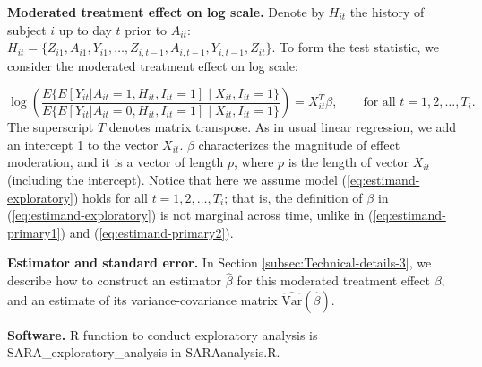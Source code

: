 \documentclass[11pt]{article}
\begin{document}
\textbf{Moderated treatment effect on log scale.} Denote by $H_{it}$ the history
of subject $i$ up to day $t$ prior to $A_{it}$: $H_{it}=\{Z_{i1},A_{i1},Y_{i1},\ldots,Z_{i,t-1},A_{i,t-1},Y_{i,t-1},Z_{it}\}$.
To form the test statistic, we consider the moderated treatment effect
on log scale:

\begin{equation}
\log\left(\frac{E\{E[Y_{it}|A_{it}=1,H_{it}, I_{it} = 1]\mid X_{it}, I_{it} = 1\}}{E\{E[Y_{it}|A_{it}=0,H_{it}, I_{it} = 1]\mid X_{it}, I_{it} = 1\}}\right)=X_{it}^{T}\beta,\qquad\text{for all }t=1,2,\ldots,T_i.\label{eq:estimand-exploratory}
\end{equation}
The superscript $T$ denotes matrix transpose. As in usual linear
regression, we add an intercept 1 to the vector $X_{it}$. $\beta$
characterizes the magnitude of effect moderation, and it is a vector
of length $p$, where $p$ is the length of vector $X_{it}$ (including
the intercept). Notice that here we assume model (\ref{eq:estimand-exploratory})
holds for all $t=1,2,\ldots,T_i$; that is, the definition of $\beta$
in (\ref{eq:estimand-exploratory}) is not marginal across time, unlike
in (\ref{eq:estimand-primary1}) and (\ref{eq:estimand-primary2}).

\textbf{Estimator and standard error.} In Section \ref{subsec:Technical-details-3},
we describe how to construct an estimator $\hat{\beta}$ for this
moderated treatment effect $\beta$, and an estimate of its variance-covariance
matrix \textbf{$\widehat{\text{Var}}(\hat{\beta})$}. 

\textbf{Software.} R function to conduct exploratory analysis is
\textsf{SARA\_exploratory\_analysis} in \textsf{SARAanalysis.R}.
\end{document}
